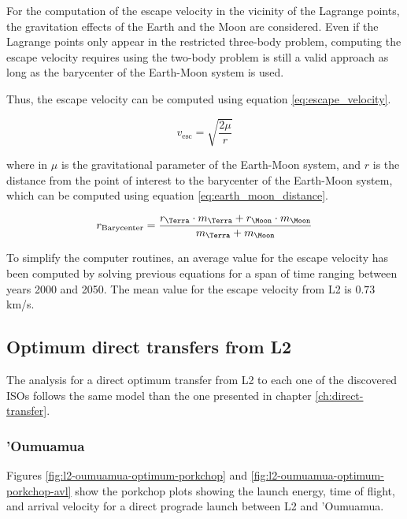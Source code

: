 For the computation of the escape velocity in the vicinity of the Lagrange
points, the gravitation effects of the Earth and the Moon are considered. Even
if the Lagrange points only appear in the restricted three-body problem,
computing the escape velocity requires using the two-body problem is still a
valid approach as long as the barycenter of the Earth-Moon system is used.

Thus, the escape velocity can be computed using equation \ref{eq:escape_velocity}.

\begin{equation}
        v_{\text{esc}} = \sqrt{\frac{2 \mu}{r}}
\label{eq:escape_velocity}
\end{equation}

where in $\mu$ is the gravitational parameter of the Earth-Moon system, and $r$
is the distance from the point of interest to the barycenter of the Earth-Moon
system, which can be computed using equation \ref{eq:earth_moon_distance}.

\begin{equation}
    r_{\text{Barycenter}} = \frac{r_{\text{\Terra}} \cdot m_{\text{\Terra}}
        + r_{\text{\Moon}} \cdot m_{\text{\Moon}}}{m_{\text{\Terra}} +
        m_{\text{\Moon}}}
    \label{eq:earth_moon_distance}
\end{equation}

To simplify the computer routines, an average value for the escape velocity has
been computed by solving previous equations for a span of time ranging between
years 2000 and 2050. The mean value for the escape velocity from L2 is $0.73$
km/s.

\subsection{Optimum direct transfers from L2}

The analysis for a direct optimum transfer from L2 to each one of the discovered
ISOs follows the same model than the one presented in chapter
\ref{ch:direct-transfer}.

\subsubsection{'Oumuamua}

Figures \ref{fig:l2-oumuamua-optimum-porkchop} and
\ref{fig:l2-oumuamua-optimum-porkchop-avl} show the porkchop plots showing the
launch energy, time of flight, and arrival velocity for a direct prograde launch
between L2 and 'Oumuamua.

